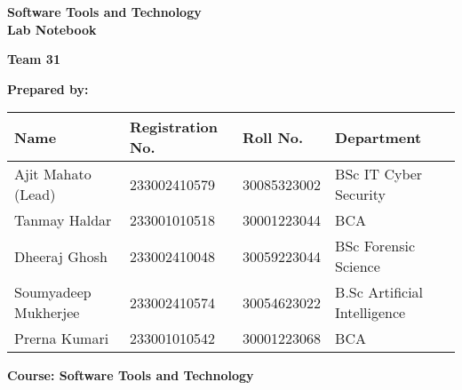 
\begin{titlepage}
    \centering
    \vspace*{2cm}
    
    {\Huge\bfseries Software Tools and Technology \\[0.4cm] Lab Notebook \\[2cm]}
    
    {\Large\textbf{Team 31}\\[1.5cm]}
    
    \vspace{0.5cm}
    \textbf{Prepared by:}\\[0.5cm]
    
    \vspace{1cm}
    \hspace*{-1.2 cm} 
\begin{tabular}{|l|l|l|l|}
    \hline
    \textbf{Name} & \textbf{Registration No.} & \textbf{Roll No.} & \textbf{Department} \\
    \hline
     Ajit Mahato (Lead) & 233002410579 & 30085323002 & BSc IT Cyber Security \\
    Tanmay Haldar & 233001010518 & 30001223044 & BCA \\
    Dheeraj Ghosh & 233002410048 & 30059223044 & BSc Forensic Science \\
    Soumyadeep Mukherjee & 233002410574 & 30054623022 & B.Sc Artificial Intelligence \\
    Prerna Kumari & 233001010542 & 30001223068 & BCA \\
    \hline
\end{tabular}

    
    \vspace{2cm}
    
    \vfill
    \textbf{Course: Software Tools and Technology}
    
\end{titlepage}


